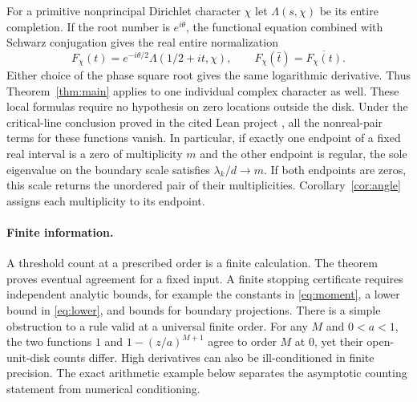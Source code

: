 \documentclass[11pt]{article}
\begin{document}
For a primitive nonprincipal Dirichlet character $\chi$ let $\Lambda(s,\chi)$ be its entire completion. If the root number is $e^{i\theta}$, the functional equation combined with Schwarz conjugation gives the real entire normalization
\[
 F_\chi(t)=e^{-i\theta/2}\Lambda(1/2+it,\chi),\qquad
 F_\chi(\bar t)=\overline{F_\chi(t)}.
\]
Either choice of the phase square root gives the same logarithmic derivative. Thus Theorem~\ref{thm:main} applies to one individual complex character as well. These local formulas require no hypothesis on zero locations outside the disk. Under the critical-line conclusion proved in the cited Lean project \cite{lean}, all the nonreal-pair terms for these functions vanish. In particular, if exactly one endpoint of a fixed real interval is a zero of multiplicity $m$ and the other endpoint is regular, the sole eigenvalue on the boundary scale satisfies $\lambda_k/d\to m$. If both endpoints are zeros, this scale returns the unordered pair of their multiplicities. Corollary~\ref{cor:angle} assigns each multiplicity to its endpoint.

\paragraph{Finite information.}
A threshold count at a prescribed order is a finite calculation. The theorem proves eventual agreement for a fixed input. A finite stopping certificate requires independent analytic bounds, for example the constants in \eqref{eq:moment}, a lower bound in \eqref{eq:lower}, and bounds for boundary projections. There is a simple obstruction to a rule valid at a universal finite order. For any $M$ and $0<a<1$, the two functions $1$ and $1-(z/a)^{M+1}$ agree to order $M$ at $0$, yet their open-unit-disk counts differ. High derivatives can also be ill-conditioned in finite precision. The exact arithmetic example below separates the asymptotic counting statement from numerical conditioning.
\end{document}
